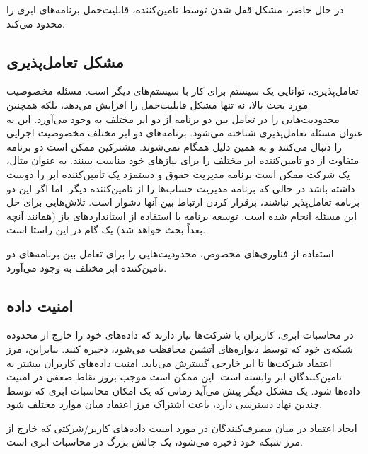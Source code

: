 \documentclass{book}
\begin{document}
    \begin{addinfo}

        در حال حاضر، مشکل قفل شدن توسط تامین‌کننده، قابلیت‌حمل برنامه‌های ابری را محدود می‌کند.

    \end{addinfo}

    \subsection{مشکل تعامل‌پذیری}

        تعامل‌پذیری، توانایی یک سیستم برای کار با سیستم‌های دیگر است. مسئله مخصوصیت مورد بحث بالا، نه تنها مشکل قابلیت‌حمل را افزایش می‌دهد، بلکه همچنین محدودیت‌هایی را در تعامل بین دو برنامه از دو ابر مختلف به وجود می‌آورد. این به عنوان مسئله تعامل‌پذیری شناخته می‌شود. برنامه‌های دو ابر مختلف مخصوصیت اجرایی را دنبال می‌کنند و به همین دلیل همگام نمی‌شوند. مشترکین ممکن است دو برنامه متفاوت از دو تامین‌کننده ابر مختلف را برای نیازهای خود مناسب ببینند. به عنوان مثال، یک شرکت ممکن است برنامه مدیریت حقوق و دستمزد یک تامین‌کننده ابر را دوست داشته باشد در حالی که برنامه مدیریت حساب‌ها را از تامین‌کننده دیگر. اما اگر این دو برنامه تعامل‌پذیر نباشند، برقرار کردن ارتباط بین آنها دشوار است. تلاش‌هایی برای حل این مسئله انجام شده است. توسعه برنامه با استفاده از استانداردهای باز (همانند آنچه بعداً بحث خواهد شد) یک گام در این راستا است.

    \begin{addinfo}
        
        استفاده از فناوری‌های مخصوص، محدودیت‌هایی را برای تعامل بین برنامه‌های دو تامین‌کننده ابر مختلف به وجود می‌آورد.

    \end{addinfo}

    \subsection{امنیت داده}

        در محاسبات ابری، کاربران یا شرکت‌ها نیاز دارند که داده‌های خود را خارج از محدوده شبکه‌ی خود که توسط دیواره‌های آتشین محافظت می‌شود، ذخیره کنند. بنابراین، مرز اعتماد شرکت‌ها تا ابر خارجی گسترش می‌یابد. امنیت داده‌های کاربران بیشتر به تامین‌کنندگان ابر وابسته است. این ممکن است موجب بروز نقاط ضعفی در امنیت داده‌ها شود. یک مشکل دیگر پیش می‌آید زمانی که یک امکان محاسبات ابری که توسط چندین نهاد دسترسی دارد، باعث اشتراک مرز اعتماد میان موارد مختلف شود.
    
    \begin{addinfo}

        ایجاد اعتماد در میان مصرف‌کنندگان در مورد امنیت داده‌های کاربر/شرکتی که خارج از مرز شبکه خود ذخیره می‌شود، یک چالش بزرگ در محاسبات ابری است.
        
    \end{addinfo}
\end{document}
